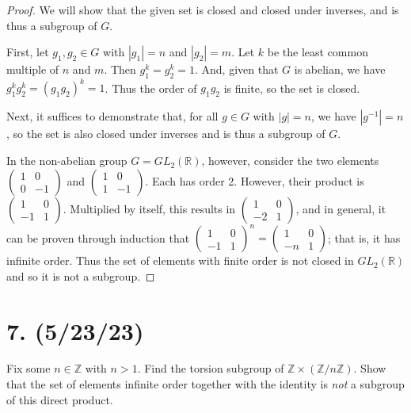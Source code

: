 \documentclass{article}
\begin{document}
\begin{proof}
    We will show that the given set is closed and closed under inverses, and is thus a subgroup of $G$.

    First, let $g_1, g_2 \in G$ with $|g_1| = n$ and $|g_2| = m$. Let $k$ be the least common multiple of $n$ and $m$. Then $g_1^k = g_2^k = 1$. And, given that $G$ is abelian, we have $g_1^k g_2^k = (g_1 g_2)^k = 1$. Thus the order of $g_1 g_2$ is finite, so the set is closed.

    Next, it suffices to demonstrate that, for all $g \in G$ with $|g| = n$, we have $|g^{-1}| = n$, so the set is also closed under inverses and is thus a subgroup of $G$.

    In the non-abelian group $G = GL_2(\mathbb{R})$, however, consider the two elements $\begin{pmatrix}1 & 0 \\ 0 & -1\end{pmatrix}$ and $\begin{pmatrix}1 & 0 \\ 1 & -1\end{pmatrix}$. Each has order 2. However, their product is $\begin{pmatrix}1 & 0 \\ -1 & 1\end{pmatrix}$. Multiplied by itself, this results in $\begin{pmatrix}1 & 0 \\ -2 & 1\end{pmatrix}$, and in general, it can be proven through induction that $\begin{pmatrix}1 & 0 \\ -1 & 1\end{pmatrix}^n =\begin{pmatrix}1 & 0 \\ -n & 1\end{pmatrix}$; that is, it has infinite order. Thus the set of elements with finite order is not closed in $GL_2(\mathbb{R})$ and so it is not a subgroup.
\end{proof}

\section*{7. (5/23/23)}

Fix some $n \in \mathbb{Z}$ with $n > 1$. Find the torsion subgroup of $\mathbb{Z} \times (\mathbb{Z}/n\mathbb{Z})$. Show that the set of elements infinite order together with the identity is \emph{not} a subgroup of this direct product.
\end{document}
